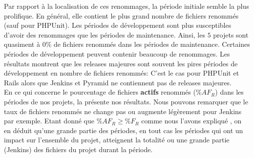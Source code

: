 Par rapport à la localisation de ces renommages, la période initiale semble la plus prolifique. En général, elle contient le plus grand nombre de fichiers renommés (sauf pour PHPUnit). Les périodes de développement sont plus susceptibles d'avoir des renommages que les périodes de maintenance. Ainsi, les $5$ projets sont quasiment à $0\%$ de fichiers renommés dans les périodes de maintenance. Certaines périodes de développement peuvent contenir beaucoup de renommages. Les résultats montrent que les releases majeures sont souvent les pires périodes de développement en nombre de fichiers renommés: C'est le cas pour PHPUnit et Rails alors que Jenkins et Pyramid ne contiennent pas de releases majeures.\\



En ce qui concerne le pourcentage de fichiers \textbf{actifs} renommés ($\%AF_R$) dans les périodes de nos projets, la  présente nos résultats. Nous pouvons remarquer que le taux de fichiers renommés ne change pas ou augmente légèrement pour Jenkins par exemple. Etant donné que $\%AF_R \geq \%F_R$ comme nous l'avons expliqué , on en déduit qu'une grande partie des périodes, en tout cas les périodes qui ont un impact sur l'ensemble du projet, atteignent la totalité ou une grande partie (Jenkins) des fichiers du projet durant la période. \\

